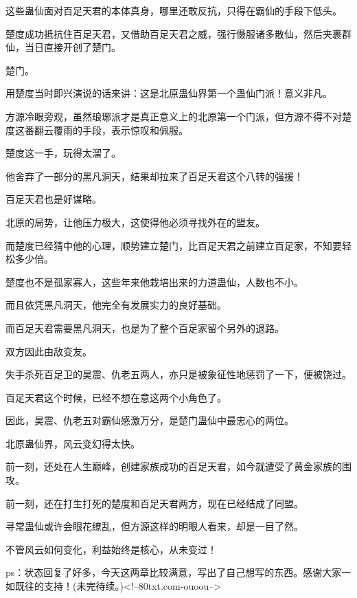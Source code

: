 \begin{this_body}
这些蛊仙面对百足天君的本体真身，哪里还敢反抗，只得在霸仙的手段下低头。

楚度成功抵抗住百足天君，又借助百足天君之威，强行慑服诸多散仙，然后夹裹群仙，当日直接开创了楚门。

楚门。

用楚度当时即兴演说的话来讲：这是北原蛊仙界第一个蛊仙门派！意义非凡。

方源冷眼旁观，虽然琅琊派才是真正意义上的北原第一个门派，但方源不得不对楚度这番翻云覆雨的手段，表示惊叹和佩服。

楚度这一手，玩得太溜了。

他舍弃了一部分的黑凡洞天，结果却拉来了百足天君这个八转的强援！

百足天君也是好谋略。

北原的局势，让他压力极大，这使得他必须寻找外在的盟友。

而楚度已经猜中他的心理，顺势建立楚门，比百足天君之前建立百足家，不知要轻松多少倍。

楚度也不是孤家寡人，这些年来他栽培出来的力道蛊仙，人数也不小。

而且依凭黑凡洞天，他完全有发展实力的良好基础。

而百足天君需要黑凡洞天，也是为了整个百足家留个另外的退路。

双方因此由敌变友。

失手杀死百足卫的昊震、仇老五两人，亦只是被象征性地惩罚了一下，便被饶过。

百足天君这个时候，已经不想在意这两个小角色了。

因此，昊震、仇老五对霸仙感激万分，是楚门蛊仙中最忠心的两位。

北原蛊仙界，风云变幻得太快。

前一刻，还处在人生巅峰，创建家族成功的百足天君，如今就遭受了黄金家族的围攻。

前一刻，还在打生打死的楚度和百足天君两方，现在已经结成了同盟。

寻常蛊仙或许会眼花缭乱，但方源这样的明眼人看来，却是一目了然。

不管风云如何变化，利益始终是核心，从未变过！

ps：状态回复了好多，今天这两章比较满意，写出了自己想写的东西。感谢大家一如既往的支持！(未完待续。)<!--80txt.com-ouoou-->

\end{this_body}

